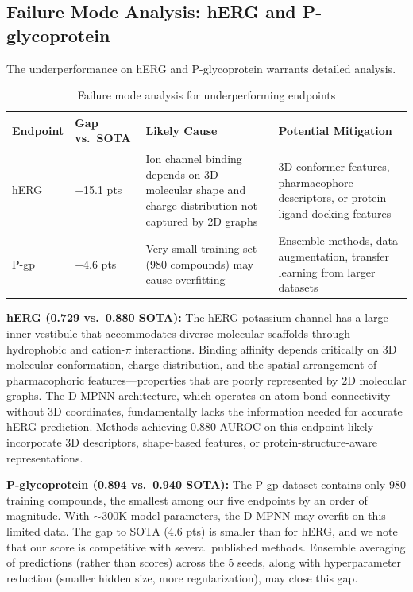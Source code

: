 \documentclass[11pt]{article}
\begin{document}
\subsection{Failure Mode Analysis: hERG and P-glycoprotein}

The underperformance on hERG and P-glycoprotein warrants detailed analysis.

\begin{table}[h]
\centering
\caption{Failure mode analysis for underperforming endpoints}
\label{tab:failure}
\begin{tabular}{lp{3cm}p{4cm}p{4cm}}
\toprule
Endpoint & Gap vs.\ SOTA & Likely Cause & Potential Mitigation \\
\midrule
hERG & $-$15.1 pts & Ion channel binding depends on 3D molecular shape and charge distribution not captured by 2D graphs & 3D conformer features, pharmacophore descriptors, or protein-ligand docking features \\
\addlinespace
P-gp & $-$4.6 pts & Very small training set (980 compounds) may cause overfitting & Ensemble methods, data augmentation, transfer learning from larger datasets \\
\bottomrule
\end{tabular}
\end{table}

\textbf{hERG (0.729 vs.\ 0.880 SOTA):} The hERG potassium channel has a large inner vestibule that accommodates diverse molecular scaffolds through hydrophobic and cation-$\pi$ interactions. Binding affinity depends critically on 3D molecular conformation, charge distribution, and the spatial arrangement of pharmacophoric features---properties that are poorly represented by 2D molecular graphs. The D-MPNN architecture, which operates on atom-bond connectivity without 3D coordinates, fundamentally lacks the information needed for accurate hERG prediction. Methods achieving 0.880 AUROC on this endpoint likely incorporate 3D descriptors, shape-based features, or protein-structure-aware representations.

\textbf{P-glycoprotein (0.894 vs.\ 0.940 SOTA):} The P-gp dataset contains only 980 training compounds, the smallest among our five endpoints by an order of magnitude. With $\sim$300K model parameters, the D-MPNN may overfit on this limited data. The gap to SOTA (4.6 pts) is smaller than for hERG, and we note that our score is competitive with several published methods. Ensemble averaging of predictions (rather than scores) across the 5 seeds, along with hyperparameter reduction (smaller hidden size, more regularization), may close this gap.
\end{document}
